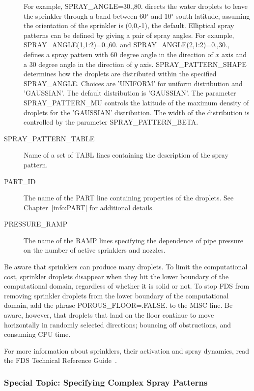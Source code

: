 \documentclass[11pt]{book}
\begin{document}
\begin{description}
For example, {\ct SPRAY\_ANGLE=30.,80.} directs the water droplets to leave
the sprinkler through a band between 60$^\circ$ and 10$^\circ$ south latitude, assuming the orientation of
the sprinkler is (0,0,-1), the default. Elliptical spray patterns can be defined by giving a pair of spray angles. For example, {\ct SPRAY\_ANGLE(1,1:2)=0.,60.}  and {\ct SPRAY\_ANGLE(2,1:2)=0.,30.}, defines a spray pattern with 60 degree angle in the direction of $x$ axis and a 30 degree angle in the direction of $y$ axis.
{\ct SPRAY\_PATTERN\_SHAPE} determines how the droplets are distributed within the specified {\ct SPRAY\_ANGLE}.
Choices are {\ct 'UNIFORM'} for uniform distribution and {\ct 'GAUSSIAN'}. The default distribution is {\ct 'GAUSSIAN'}. The parameter {\ct SPRAY\_PATTERN\_MU} controls the latitude of
the maximum density of droplets for the {\ct 'GAUSSIAN'} distribution. The width of the distribution is controlled by the parameter {\ct SPRAY\_PATTERN\_BETA}.
\item[{\ct SPRAY\_PATTERN\_TABLE}] Name of a set of {\ct TABL} lines containing the description of the spray pattern.
\item[{\ct PART\_ID}] The name of the {\ct PART} line containing properties of the droplets.
See Chapter~\ref{info:PART} for additional details.
\item[{\ct PRESSURE\_RAMP}] The name of the {\ct RAMP} lines specifying the dependence of pipe pressure on the
number of active sprinklers and nozzles.
\end{description}

\noindent
Be aware that sprinklers can produce many droplets. To limit the computational cost, sprinkler droplets disappear when they hit the
lower boundary of the computational domain, regardless of whether it is solid
or not. To stop FDS from removing sprinkler droplets from the lower boundary of the computational domain,
add the phrase {\ct POROUS\_FLOOR=.FALSE.} to the {\ct MISC} line. Be aware, however, that
droplets that land on the floor continue to move horizontally in randomly selected
directions; bouncing off obstructions, and consuming CPU time.

For more information about sprinklers, their activation and spray dynamics, read the FDS
Technical Reference Guide~\cite{FDS_Math_Guide}.


\subsubsection{Special Topic: Specifying Complex Spray Patterns}
\label{info:spraypattern}
\label{info:TABL}
\end{document}
